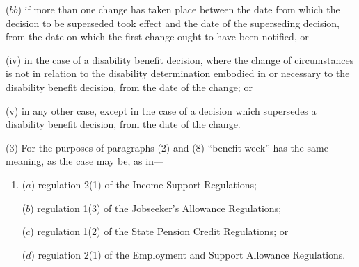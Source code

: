 \documentclass[12pt,a4paper]{article}
\begin{document}
\begin{enumerate}
\begin{enumerate}
\begin{enumerate}
($bb$) if more than one change has taken place between the date from which the decision to be superseded took effect and the date of the superseding decision, from the date on which the first change ought to have been notified, or
\end{enumerate}


(iv) in the case of a disability benefit decision, where the change of circumstances is not in relation to the disability determination embodied in or necessary to the disability benefit decision, from the date of the change; or

(v) in any other case, except in the case of a decision which supersedes a disability benefit decision, from the date of the change.
\end{enumerate}
\end{enumerate}



(3) For the purposes of paragraphs (2) and (8) “benefit week” has the same meaning, as the case may be, as in—
\begin{enumerate}\item[]
($a$) regulation 2(1) of the Income Support Regulations;

($b$) regulation 1(3) of the Jobseeker’s Allowance Regulations;

($c$) regulation 1(2) of the State Pension Credit Regulations; or

($d$) regulation 2(1) of the Employment and Support Allowance Regulations.
\end{enumerate}
\end{document}
